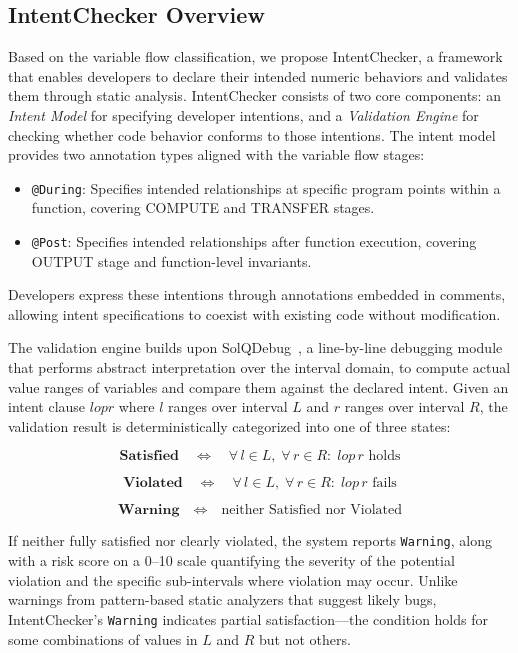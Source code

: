 \documentclass[pdflatex,sn-basic]{sn-jnl}%
\theoremstyle{thmstyleone}%
\theoremstyle{thmstyletwo}%
\theoremstyle{thmstylethree}%
\begin{document}
\subsection{IntentChecker Overview}

Based on the variable flow classification, we propose IntentChecker, a framework that enables developers to declare their intended numeric behaviors and validates them through static analysis.
IntentChecker consists of two core components: an \textit{Intent Model} for specifying developer intentions, and a \textit{Validation Engine} for checking whether code behavior conforms to those intentions.
The intent model provides two annotation types aligned with the variable flow stages:

\begin{itemize}
    \item \texttt{@During}: Specifies intended relationships at specific program points within a function, covering COMPUTE and TRANSFER stages.
    \item \texttt{@Post}: Specifies intended relationships after function execution, covering OUTPUT stage and function-level invariants.
\end{itemize}

Developers express these intentions through annotations embedded in comments, allowing intent specifications to coexist with existing code without modification.

The validation engine builds upon SolQDebug~\citep{solqdebug}, a line-by-line debugging module that performs abstract interpretation over the interval domain, to compute actual value ranges of variables and compare them against the declared intent.
Given an intent clause $l \mathrel{op} r$ where $l$ ranges over interval $L$ and $r$ ranges over interval $R$, the validation result is deterministically categorized into one of three states:

\[
  \textbf{Satisfied} \quad \Longleftrightarrow \quad
    \forall\, l \in L,\; \forall\, r \in R:\; l \mathrel{op}\, r \text{ holds}
\]

\[
  \textbf{Violated} \quad \Longleftrightarrow \quad
    \forall\, l \in L,\; \forall\, r \in R:\; l \mathrel{op}\, r \text{ fails}
\]

\[
  \textbf{Warning} \quad \Longleftrightarrow \quad
    \text{neither Satisfied nor Violated}
\]

If neither fully satisfied nor clearly violated, the system reports \texttt{Warning}, along with a risk score on a 0--10 scale quantifying the severity of the potential violation and the specific sub-intervals where violation may occur.
Unlike warnings from pattern-based static analyzers that suggest likely bugs, IntentChecker's \texttt{Warning} indicates partial satisfaction---the condition holds for some combinations of values in $L$ and $R$ but not others.
\end{document}
